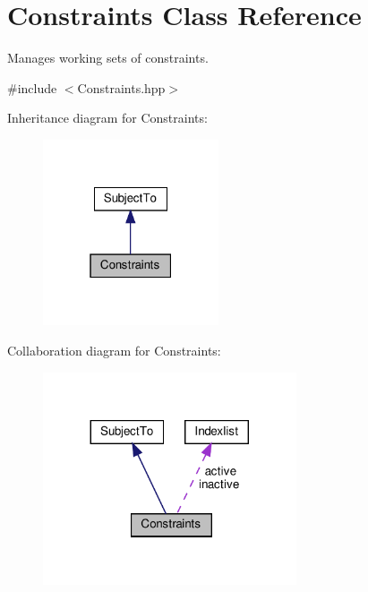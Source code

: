 \hypertarget{class_constraints}{}\section{Constraints Class Reference}
\label{class_constraints}


Manages working sets of constraints.  




{\ttfamily \#include $<$Constraints.\+hpp$>$}



Inheritance diagram for Constraints\+:
\nopagebreak
\begin{figure}[H]
\begin{center}
\leavevmode
\includegraphics[width=147pt]{class_constraints__inherit__graph}
\end{center}
\end{figure}


Collaboration diagram for Constraints\+:
\nopagebreak
\begin{figure}[H]
\begin{center}
\leavevmode
\includegraphics[width=212pt]{class_constraints__coll__graph}
\end{center}
\end{figure}
